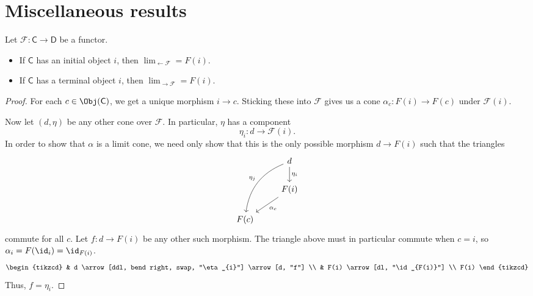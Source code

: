 \documentclass[main.tex]{subfiles}
\begin{document}
\section{Miscellaneous results}
\label{sec:miscellaneous_results}

\begin{theorem}
  \label{thm:limit_over_category_with_initial_object_is_that}
  Let $\mathcal{F}\colon \mathsf{C} \to \mathsf{D}$ be a functor.

  \begin{itemize}
    \item If $\mathsf{C}$ has an initial object $i$, then $\lim_{\leftarrow \mathcal{F}} = F(i)$.

    \item If $\mathsf{C}$ has a terminal object $i$, then $\lim_{\rightarrow \mathcal{F}} = F(i)$.
  \end{itemize}
\end{theorem}
\begin{proof}
  For each $c \in \Obj(\mathsf{C})$, we get a unique morphism $i \to c$. Sticking these into $\mathcal{F}$ gives us a cone $\alpha_{c}\colon F(i) \to F(c)$ under $\mathcal{F}(i)$.

  Now let $(d, \eta)$ be any other cone over $\mathcal{F}$. In particular, $\eta$ has a component
  \begin{equation*}
    \eta_{i}\colon d \to \mathcal{F}(i).
  \end{equation*}
  In order to show that $\alpha$ is a limit cone, we need only show that this is the only possible morphism $d \to F(i)$ such that the triangles
  \begin{equation*}
    \begin{tikzcd}
      & d
      \arrow[ddl, bend right, swap, "\eta_{j}"]
      \arrow[d, "\eta_{i}"]
      \\
      & F(i)
      \arrow[dl, "\alpha_{c}"]
      \\
      F(c)
    \end{tikzcd}
  \end{equation*}
  commute for all $c$. Let $f\colon d \to F(i)$ be any other such morphism. The triangle above must in particular commute when $c = i$, so $\alpha_{i} = F(\id_{i}) = \id_{F(i)}$.
  \begin{equation*}
    \begin{tikzcd}
      & d
      \arrow[ddl, bend right, swap, "\eta_{i}"]
      \arrow[d, "f"]
      \\
      & F(i)
      \arrow[dl, "\id_{F(i)}"]
      \\
      F(i)
    \end{tikzcd}
  \end{equation*}
  Thus, $f = \eta_{i}$.
\end{proof}
\end{document}
